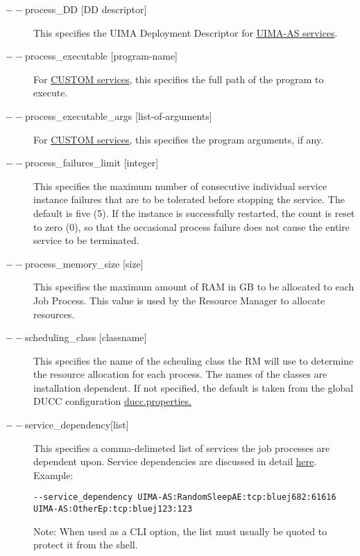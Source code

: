 \begin{description}
      \item[$--$process\_DD {[DD descriptor]}] 
        This specifies the UIMA Deployment Descriptor for \hyperref[sec:services.types]{UIMA-AS services}.

      \item[$--$process\_executable {[program-name]}] For \hyperref[sec:services.types]{CUSTOM
          services}, this specifies the full path of the program to execute.

      \item[$--$process\_executable\_args {[list-of-arguments]}] For \hyperref[sec:services.types]{CUSTOM
          services}, this specifies the program arguments, if any.

      \item[$--$process\_failures\_limit {[integer]}] 
        This specifies the maximum number of consecutive individual service instance failures that are to be 
        tolerated before stopping the service. The default is five (5). If the instance is successfully
        restarted, the count is reset to zero (0), so that the occasional process failure does not cause
        the entire service to be terminated.
        
      \item[$--$process\_memory\_size {[size]}] This specifies the maximum amount of RAM in GB to be
        allocated to each Job Process.  This value is used by the Resource Manager to allocate
        resources. 

      \item[$--$scheduling\_class {[classname]}] This specifies the name of the scheuling class the RM
        will use to determine the resource allocation for each process. The names of the classes are
        installation dependent. If not specified, the default is taken from the global DUCC
        configuration \hyperref[sec:ducc.properties]{ducc.properties.}

      \item[$--$service\_dependency{[list]}] This specifies a comma-delimeted list of services the job
        processes are dependent upon. Service dependencies are discussed in detail
        \hyperref[sec:service.endpoints]{here}. Example:
\begin{verbatim}
--service_dependency UIMA-AS:RandomSleepAE:tcp:bluej682:61616 UIMA-AS:OtherEp:tcp:bluej123:123 
\end{verbatim}

        Note: When used as a CLI option, the list must usually be
        quoted to protect it from the shell.
          


\end{description}
